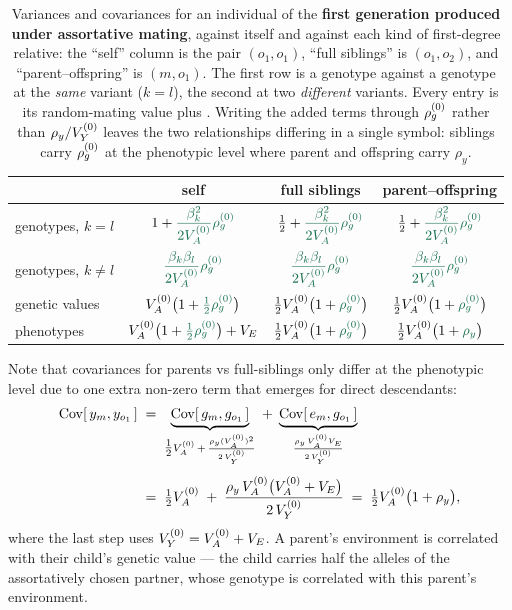 \documentclass[12pt]{article}
\begin{document}
\begin{table}[H]
    \begin{floatcard}
    \renewcommand{\arraystretch}{1.9}
    \setlength{\tabcolsep}{2pt}
    \footnotesize
    \begin{tabular}{l|ccc}
            & self
            & full siblings
            & parent--offspring \\
        \hline
        genotypes, $k = l$
            & $1 + \adds{\dfrac{\beta_k^2}{2\VAo}\rhogo}$
            & $\tfrac12 + \adds{\dfrac{\beta_k^2}{2\VAo}\rhogo}$
            & $\tfrac12 + \adds{\dfrac{\beta_k^2}{2\VAo}\rhogo}$ \\
        genotypes, $k \neq l$
            & $\adds{\dfrac{\beta_k\beta_l}{2\VAo}\rhogo}$
            & $\adds{\dfrac{\beta_k\beta_l}{2\VAo}\rhogo}$
            & $\adds{\dfrac{\beta_k\beta_l}{2\VAo}\rhogo}$ \\
        genetic values
            & $\VAo\big(1 + \adds{\tfrac12\rhogo}\big)$
            & $\tfrac12\VAo\big(1 + \adds{\rhogo}\big)$
            & $\tfrac12\VAo\big(1 + \adds{\rhogo}\big)$ \\
        phenotypes
            & $\VAo\big(1 + \adds{\tfrac12\rhogo}\big) + V_E$
            & $\tfrac12\VAo\big(1 + \adds{\rhogo}\big)$
            & $\tfrac12\VAo\big(1 + \adds{\rho_y}\big)$ \\
    \end{tabular}
    \caption{%
        Variances and covariances for an individual of the \textbf{first generation produced under assortative mating}, against itself and against each kind of first-degree relative: the ``self'' column is the pair $(o_1, o_1)$, ``full siblings'' is $(o_1, o_2)$, and ``parent--offspring'' is $(m, o_1)$. The first row is a genotype against a genotype at the \emph{same} variant ($k = l$), the second at two \emph{different} variants.
        Every entry is its random-mating value plus .
        Writing the added terms through $\rho_g^{(0)}$ rather than $\rho_y/V_Y^{(0)}$ leaves the two relationships differing in a single symbol: siblings carry $\rho_g^{(0)}$ at the phenotypic level where parent and offspring carry $\rho_y$.%
    }
    \label{tab:relatives-gen1}
    \end{floatcard}
\end{table}

Note that covariances for parents vs full-siblings only differ at the phenotypic level due to one extra non-zero term that emerges for direct descendants:
$$
\begin{aligned}
    \mathrm{Cov}[\,y_m, y_{o_1}\,]
    \;&=\; \underbrace{\mathrm{Cov}[\,g_m, g_{o_1}\,]}_{\tfrac12V_A^{(0)} \,+\, \frac{\rho_y (V_A^{(0)})^2}{2\,V_Y^{(0)}}}
    \;+\; \underbrace{\mathrm{Cov}[\,e_m, g_{o_1}\,]}_{\frac{\rho_y\,V_A^{(0)} V_E}{2\,V_Y^{(0)}}} \\[4pt]
    \;&=\; \tfrac12V_A^{(0)} \;+\; \frac{\rho_y\,V_A^{(0)}\big(V_A^{(0)} + V_E\big)}{2\,V_Y^{(0)}}
    \;=\; \tfrac12V_A^{(0)}\big(1+\rho_y\big) ,
\end{aligned}
$$
where the last step uses $V_Y^{(0)} = V_A^{(0)} + V_E$.
A parent's environment is correlated with their child's genetic value --- the child carries half the alleles of the assortatively chosen partner, whose genotype is correlated with this parent's environment.
\end{document}
